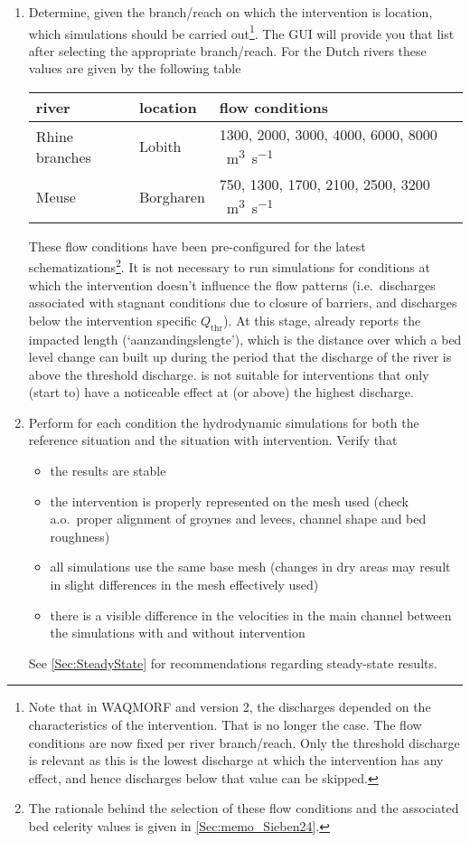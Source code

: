 \begin{enumerate}
\item Determine, given the branch/reach on which the intervention is location, which \dflowfm simulations should be carried out\footnote{Note that in WAQMORF and \dfmi version 2, the discharges depended on the characteristics of the intervention.
That is no longer the case.
The flow conditions are now fixed per river branch/reach.
Only the threshold discharge is relevant as this is the lowest discharge at which the intervention has any effect, and hence discharges below that value can be skipped.}.
The \dfmi GUI will provide you that list after selecting the appropriate branch/reach.
For the Dutch rivers these values are given by the following table
\newline
\newline
\begin{tabular}{l|l|l}
river & location & flow conditions \\ \hline
Rhine branches & Lobith & 1300, 2000, 3000, 4000, 6000, 8000 \SI{}{\metre\cubed\per\second}\\
Meuse & Borgharen & 750, 1300, 1700, 2100, 2500, 3200 \SI{}{\metre\cubed\per\second}
\end{tabular}
\newline
\newline
These flow conditions have been pre-configured for the latest \dflowfm schematizations\footnote{The rationale behind the selection of these flow conditions and the associated bed celerity values is given in \autoref{Sec:memo_Sieben24}.}.
It is not necessary to run simulations for conditions at which the intervention doesn't influence the flow patterns (i.e.~discharges associated with stagnant conditions due to closure of barriers, and discharges below the intervention specific $Q_\text{thr}$).
At this stage, \dfmi already reports the impacted length (`aanzandingslengte'), which is the distance over which a bed level change can built up during the period that the discharge of the river is above the threshold discharge.
\dfmi is not suitable for interventions that only (start to) have a noticeable effect at (or above) the highest discharge.

\item Perform for each condition the hydrodynamic simulations for both the reference situation and the situation with intervention.
Verify that
\begin{itemize}
\item the \dflowfm results are stable
\item the intervention is properly represented on the mesh used (check a.o.~proper alignment of groynes and levees, channel shape and bed roughness)
\item all simulations use the same base mesh (changes in dry areas may result in slight differences in the mesh effectively used)
\item there is a visible difference in the velocities in the main channel between the simulations with and without intervention
\end{itemize}
See \autoref{Sec:SteadyState} for recommendations regarding steady-state results.


\end{enumerate}
